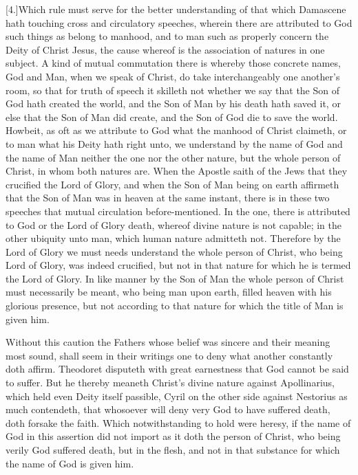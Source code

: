 [4.]Which rule must serve for the better understanding of that which Damascene hath touching cross and circulatory speeches, wherein there are attributed to God such things as belong to manhood, and to man such as properly concern the Deity of Christ Jesus, the cause whereof is the association of natures in one subject. A kind of mutual commutation there is whereby those concrete names, God and Man, when we speak of Christ, do take interchangeably one another’s room, so that for truth of speech it skilleth not whether we say that the Son of God hath created the world, and the Son of Man by his death hath saved it, or else that the Son of Man did create, and the Son of God die to save the world. Howbeit, as oft as we attribute to God what the manhood of Christ claimeth, or to man what his Deity hath right unto, we understand by the name of God and the name of Man neither the one nor the other nature, but the whole person of Christ, in whom both natures are. When the Apostle saith of the Jews that they crucified the Lord of Glory, and when the Son of Man being on earth affirmeth that the Son of Man was in heaven at the same instant, there is in these two speeches that mutual circulation before-mentioned. In the one, there is attributed to God or the Lord of Glory death, whereof divine nature is not capable; in the other ubiquity unto man, which human nature admitteth not. Therefore by the Lord of Glory we must needs understand the  whole person of Christ, who being Lord of Glory, was indeed crucified, but not in that nature for which he is termed the Lord of Glory.
 In like manner by the Son of Man the whole person of Christ must necessarily be meant, who being man upon earth, filled heaven with his glorious presence, but not according to that nature for which the title of Man is given him.

Without this caution the Fathers whose belief was sincere and their meaning most sound, shall seem in their writings one to deny what another constantly doth affirm. Theodoret disputeth with great earnestness that God cannot be said to suffer. But he thereby meaneth Christ’s divine nature against Apollinarius, which held even Deity itself passible, Cyril on the other side against Nestorius as much contendeth, that whosoever will deny very God to have suffered death, doth forsake the faith. Which notwithstanding to hold were heresy, if the name of God in this assertion did not import as it doth the person of Christ, who being verily God suffered death, but in the flesh, and not in that substance for which the name of God is given him.


